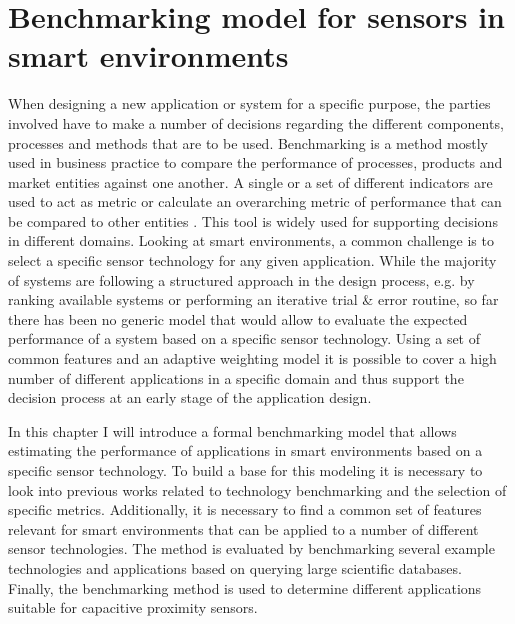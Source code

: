 \chapter{Benchmarking model for sensors in smart environments} 
\label{ch:benchmark}
When designing a new application or system for a specific purpose, the parties involved have to make a number of decisions regarding the different components, processes and methods that are to be used. Benchmarking is a method mostly used in business practice to compare the performance of processes, products and market entities against one another. A single or a set of different indicators are used to act as metric or calculate an overarching metric of performance that can be compared to other entities \cite{camp1989benchmarking}. This tool is widely used for supporting decisions in different domains. Looking at smart environments, a common challenge is to select a specific sensor technology for any given application. While the majority of systems are following a structured approach in the design process, e.g. by ranking available systems or performing an iterative trial \& error routine, so far there has been no generic model that would allow to evaluate the expected performance of a system based on a specific sensor technology. Using a set of common features and an adaptive weighting model it is possible to cover a high number of different applications in a specific domain and thus support the decision process at an early stage of the application design. 

In this chapter I will introduce a formal benchmarking model that allows estimating the performance of applications in smart environments based on a specific sensor technology. To build a base for this modeling it is necessary to look into previous works related to technology benchmarking and the  selection of specific metrics. Additionally, it is necessary to find a common set of features relevant for smart environments that can be applied to a number of different sensor technologies. The method is evaluated by benchmarking several example technologies and applications based on querying large scientific databases. Finally, the benchmarking method is used to determine different applications suitable for capacitive proximity sensors.

